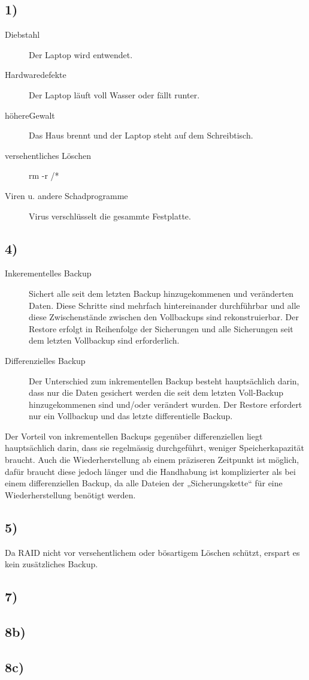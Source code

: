 \documentclass[ngerman]{fbi-aufgabenblatt}
\begin{document}
\setcounter{section}{0}
   


\subsection*{1)}
\begin{description}
	\item[Diebstahl] Der Laptop wird entwendet.
	\item [Hardwaredefekte] Der Laptop läuft voll Wasser oder fällt runter.
	\item [höhereGewalt] Das Haus brennt und der Laptop steht auf dem Schreibtisch.
	\item [versehentliches Löschen] rm -r /*
	\item[Viren u. andere Schadprogramme] Virus verschlüsselt die gesammte Festplatte.
\end{description} 

\subsection*{4)}
\begin{description}
	\item[Inkerementelles Backup] 
	Sichert alle seit dem letzten Backup hinzugekommenen und veränderten Daten.
	Diese Schritte sind mehrfach hintereinander durchführbar und alle diese Zwischenstände zwischen den Vollbackups sind rekonstruierbar. Der Restore erfolgt in Reihenfolge der Sicherungen und alle Sicherungen seit dem letzten Vollbackup sind erforderlich. 
	
	\item [Differenzielles Backup] 
	Der Unterschied zum inkrementellen Backup besteht hauptsächlich darin, dass nur die Daten gesichert werden die seit dem letzten Voll-Backup hinzugekommenen sind und/oder verändert wurden.
	Der Restore erfordert nur ein Vollbackup und das letzte differentielle Backup. 
\end{description} 

Der Vorteil von inkrementellen Backups gegenüber differenziellen liegt hauptsächlich darin, dass sie regelmässig durchgeführt, weniger Speicherkapazität braucht. Auch die Wiederherstellung ab einem präziseren Zeitpunkt ist möglich,  dafür braucht diese jedoch länger und die Handhabung ist komplizierter als bei einem differenziellen Backup, da alle Dateien der „Sicherungskette“ für eine Wiederherstellung benötigt werden.



\subsection*{5)}
Da RAID nicht vor versehentlichem oder bösartigem Löschen schützt, erspart es kein zusätzliches Backup.

\subsection*{7)}

\subsection*{8b)}

\subsection*{8c)}
\end{document}
